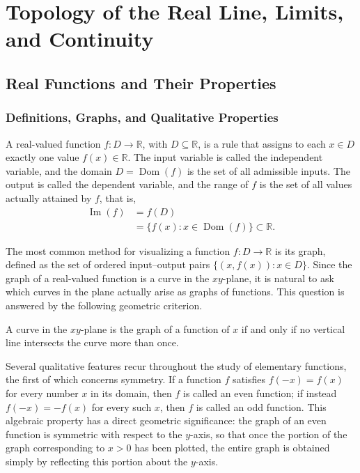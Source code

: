\chapter{Topology of the Real Line, Limits, and Continuity}

\section{Real Functions and Their Properties}

\subsection{Definitions, Graphs, and Qualitative Properties}

A real-valued function $f : D \to \mathbb{R}$, with $D \subseteq \mathbb{R}$, is a rule that assigns to each $x \in D$ exactly one value $f(x) \in \mathbb{R}$. The input variable is called the independent variable, and the domain $D = \operatorname{Dom}(f)$ is the set of all admissible inputs. The output is called the dependent variable, and the range of $f$ is the set of all values actually attained by $f$, that is,
\[
\begin{aligned}
\operatorname{Im}(f) &= f(D) \\
&= \{ f(x) : x \in \operatorname{Dom}(f) \} \subset \mathbb{R}.
\end{aligned}
\]

The most common method for visualizing a function $f : D \to \mathbb{R}$ is its graph, defined as the set of ordered input--output pairs $\{ (x, f(x)) : x \in D \}$. Since the graph of a real-valued function is a curve in the $xy$-plane, it is natural to ask which curves in the plane actually arise as graphs of functions. This question is answered by the following geometric criterion.

\begin{theorem}
A curve in the $xy$-plane is the graph of a function of $x$ if and only if no vertical line intersects the curve more than once.
\end{theorem}


Several qualitative features recur throughout the study of elementary functions, the first of which concerns symmetry. If a function $f$ satisfies $f(-x) = f(x)$ for every number $x$ in its domain, then $f$ is called an even function; if instead $f(-x) = -f(x)$ for every such $x$, then $f$ is called an odd function. This algebraic property has a direct geometric significance: the graph of an even function is symmetric with respect to the $y$-axis, so that once the portion of the graph corresponding to $x > 0$ has been plotted, the entire graph is obtained simply by reflecting this portion about the $y$-axis.

